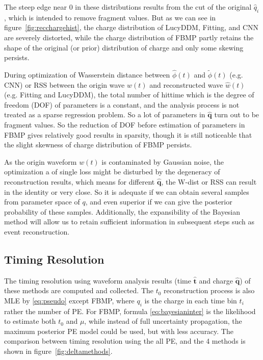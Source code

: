 The steep edge near 0 in these distributions results from the cut of the original $\hat{q}_i$, which is intended to remove fragment values. But as we can see in figure~\ref{fig:recchargehist}, the charge distribution of LucyDDM, Fitting, and CNN are severely distorted, while the charge distribution of FBMP partly retains the shape of the original (or prior) distribution of charge and only some skewing persists. 

During optimization of Wasserstein distance between $\hat{\phi}(t)$ and $\tilde{\phi}(t)$ (e.g. CNN) or RSS between the origin wave $w(t)$ and reconstructed wave $\hat{w}(t)$ (e.g. Fitting and LucyDDM), the total number of hittime which is the degree of freedom (DOF) of parameters is a constant, and the analysis process is not treated as a sparse regression problem. So a lot of parameters in $\bm{\hat{q}}$ turn out to be fragment values. So the reduction of DOF before estimation of parameters in FBMP gives relatively good results in sparsity, though it is still noticeable that the slight skewness of charge distribution of FBMP persists. 


As the origin waveform $w(t)$ is contaminated by Gaussian noise, the optimization a of single loss might be disturbed by the degeneracy of reconstruction results, which means for different $\bm{\hat{q}}$, the W-dist or RSS can result in the identity or very close. So it is adequate if we can obtain several samples from parameter space of $q$, and even superior if we can give the posterior probability of these samples. Additionally, the expansibility of the Bayesian method will allow us to retain sufficient information in subsequent steps such as event reconstruction. 

\subsection{Timing Resolution}
\label{subsec:timeresolution}


The timing resolution using waveform analysis results (time $\bm{\hat{t}}$ and charge $\bm{\hat{q}}$) of these methods are computed and collected. The $t_{0}$ reconstruction process is also MLE by \eqref{eq:pseudo} except FBMP, where $q_{i}$ is the charge in each time bin $t_{i}$ rather the number of PE. For FBMP, formula \eqref{eq:bayesianinter} is the likelihood to estimate both $t_{0}$ and $\mu$, while instead of full uncertainty propagation, the maximum posterior PE model could be used, but with less accuracy. The comparison between timing resolution using the all PE, and the 4 methods is shown in figure~\ref{fig:deltamethods}. 

